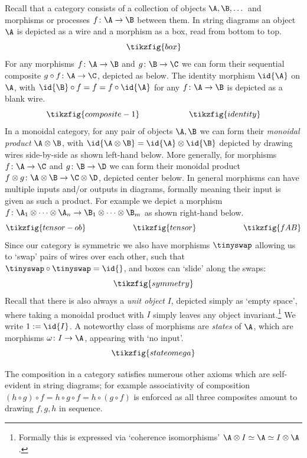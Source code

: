 \documentclass{article}
\begin{document}
Recall that a category consists of a collection of objects $\A, \B, \dots$ and morphisms or processes $f \colon \A \to \B$ between them. In string diagrams an object $\A$ is depicted as a wire and a morphism as a box, read from bottom to top. 
\[
\tikzfig{box} 
\]
For any morphisms $f \colon \A \to \B$ and $g \colon \B \to \C$ we can form their sequential composite $g \circ f \colon \A \to \C$, depicted as below. The identity morphism $\id{\A}$ on $\A$, with $\id{\B} \circ f = f  = f \circ \id{\A}$ for any $f \colon \A \to \B$ is depicted as a blank wire.
\[
\tikzfig{composite-1}
\qquad  \qquad \qquad 
\tikzfig{identity}
\]
In a monoidal category, for any pair of objects $\A, \B$ we can form their \emph{monoidal product} $\A \otimes \B$, with $\id{\A \otimes \B} = \id{\A} \otimes \id{\B}$ depicted by drawing wires side-by-side as shown left-hand below. More generally, for morphisms $f \colon \A \to \C$ and $g \colon \B \to \D$ we can form their monoidal product $f \otimes g \colon \A \otimes \B \to \C \otimes \D$, depicted center below. 
In general morphisms can have multiple inputs and/or outputs in diagrams, formally meaning their input is given as such a product. For example we depict a morphism $f \colon \A_1 \otimes \dots \otimes \A_n \to \B_1 \otimes \dots \otimes \B_m$ as shown right-hand below. 
\[
\tikzfig{tensor-ob}
\qquad \qquad \qquad 
\tikzfig{tensor}
\qquad \qquad \qquad 
\tikzfig{fAB}
\]
Since our category is symmetric we also have morphisms $\tinyswap$ allowing us to `swap' pairs of wires over each other, such that $\tinyswap \circ \tinyswap = \id{}$, and boxes can `slide' along the swaps:  
\[
\tikzfig{symmetry}
\]
Recall that there is also always a \emph{unit object} $I$, depicted simply as `empty space', where taking a monoidal product with $I$ simply leaves any object invariant.\footnote{Formally this is expressed via `coherence isomorphisms' $\A \otimes I \simeq \A \simeq I \otimes \A$.} We write $1 := \id{I}$. A noteworthy class of morphisms are \emph{states} of $\A$, which are morphisms $\omega \colon I \to \A$,  appearing with `no input'. 
\[
\tikzfig{stateomega} 
\]

The composition in a category satisfies numerous other axioms which are self-evident in string diagrams; for example associativity of composition $(h \circ g) \circ f = h \circ g \circ f = h \circ (g \circ f)$ is enforced as all three composites amount to drawing $f, g, h$ in sequence.
\end{document}
